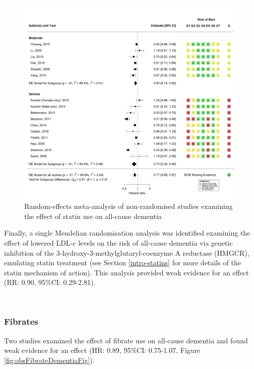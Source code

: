 \documentclass[a4paper, twoside]{templates/ociamthesis}
\begin{document}
\begin{figure}[H]
\includegraphics[width=1\linewidth]{figures/sys-rev/fp_obs_Statin-Ever_Dementia} \caption[Random-effects meta-analysis of statins on all-cause dementia]{Random-effects meta-analysis of non-randomised studies examining the effect of statin use on all-cause dementia}\label{fig:obsStatinDementiaFig}
\end{figure}

Finally, a single Mendelian randomisation analysis was identified examining the effect of lowered LDL-c levels on the risk of all-cause dementia via genetic inhibition of the 3-hydroxy-3-methylglutaryl-coenzyme A reductase (HMGCR), emulating statin treatment (see Section \ref{intro-statins} for more details of the statin mechanism of action). This analysis provided weak evidence for an effect (RR: 0.90, 95\%CI: 0.29-2.81).

~

\hypertarget{fibrates}{%
\subsubsection{Fibrates}\label{fibrates}}

Two studies examined the effect of fibrate use on all-cause dementia and found weak evidence for an effect (HR: 0.89, 95\%CI: 0.75-1.07, Figure \ref{fig:obsFibrateDementiaFig}).
\end{document}
